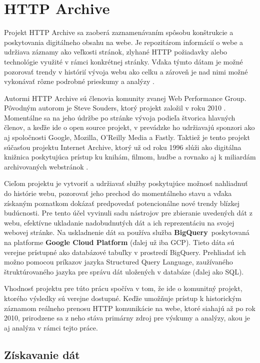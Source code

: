 \section{HTTP Archive}
\label{httparchive}

Projekt HTTP Archive sa zaoberá zaznamenávaním spôsobu konštrukcie a poskytovania digitálneho obsahu na webe. 
Je repozitárom informácií o webe a udržiava záznamy ako veľkosti
stránok, zlyhané HTTP požiadavky alebo technológie využité v rámci konkrétnej stránky. 
Vďaka týmto dátam je možné pozorovať trendy v histórií vývoja webu ako celku a zároveň je nad nimi možné vykonávať rôzne podrobné prieskumy a analýzy \cite{httparchive-about}. 

Autormi HTTP Archive sú členovia komunity zvanej Web Performance Group. Pôvodným autorom je Steve Souders, ktorý projekt založil v roku 2010 \cite{httparchive-faq}.
Momentálne sa na jeho údržbe po stránke vývoja podieľa štvorica hlavných členov, a keďže ide o open source projekt, v prevádzke ho udržiavajú sponzori ako aj spoločnosti Google, Mozilla, O'Reilly Media a Fastly.
Taktiež je tento projekt súčasťou projektu Internet Archive, ktorý už od roku 1996 slúži ako digitálna knižnica poskytujúca prístup ku knihám, filmom, hudbe a rovnako aj k miliardám archivovaných webstránok \cite{httparchive-about}.

Cieľom projektu je vytvoriť a udržiavať služby poskytujúce možnosť nahliadnuť do histórie webu, pozorovať jeho prechod do momentálneho stavu a vďaka získaným poznatkom dokázať
predpovedať potencionálne nové trendy blízkej budúcnosti. 
Pre tento účel vyvinuli sadu nástrojov pre zbieranie uvedených dát z webu, efektívne ukladanie nadobudnutých dát a ich reprezentáciu na svojej webovej stránke.
Na uskladnenie dát sa používa služba \mbox{\textbf{BigQuery} poskytovaná} na platforme \textbf{Google Cloud Platform} (ďalej už iba GCP).
Tieto dáta sú verejne prístupné ako databázové tabuľky v prostredí BigQuery.
Prehliadať ich možno pomocou príkazov jazyka Structured Query Language, zaužívaného štruktúrovaného jazyka pre správu dát uložených v databáze (ďalej ako SQL).

Vhodnosť projektu pre túto prácu spočíva v tom, že ide o komunitný projekt, ktorého výsledky sú verejne dostupné. 
Keďže umožňuje prístup k historickým záznamom reálneho prenosu HTTP komunikácie na webe, ktoré siahajú až po rok 2010, prirodzene sa z neho stáva primárny zdroj pre výskumy a analýzy, akou je aj analýza v rámci tejto práce.


\subsection{Získavanie dát}
\label{fetching-data}

